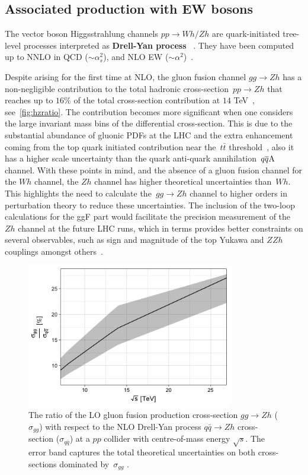 \subsection{Associated production with EW bosons \label{vhproduction}}
The vector boson Higgsstrahlung channels $pp\to Wh/Zh$ are quark-initiated tree-level processes interpreted as \textbf{Drell-Yan process}~ \cite{Han:1991ia,Brein:2003wg}. They have been computed up to  NNLO in QCD ($\sim \alpha_s^2$), and  NLO EW  ($\sim \alpha^2 $)~\cite{Amoroso:2020lgh}.
\par Despite arising for the first time at NLO, the gluon fusion channel $g g \rightarrow Zh$ has a non-negligible contribution to the total hadronic cross-section~$pp\to Zh$ that reaches up to $16\%$ of the total cross-section contribution at $14$ TeV~\cite{Cepeda:2019klc}, see~\autoref{fig:hzratio}. The contribution becomes more significant when one considers the  large invariant mass bins of the differential cross-section. This is due to the substantial abundance of gluonic PDFs at the LHC and the extra enhancement coming from the top quark initiated contribution near the~$t\bar t$ threshold~\cite{Englert:2013vua}, also it has a higher scale uncertainty than the quark anti-quark annihilation~$q\overline q \rm A$ channel.  With these points in mind, and the absence of a gluon fusion channel for the $Wh$ channel, the $Zh$ channel has higher theoretical uncertainties than~$Wh$. This highlights the need to calculate the~$g g \rightarrow Z h$ channel to higher orders in perturbation theory to reduce these uncertainties. The inclusion of the two-loop calculations for the ggF part would facilitate the precision measurement of the $Zh$ channel at the future LHC runs, which in terms provides better constraints on several observables, such as sign and magnitude of the top Yukawa and $ZZh$ couplings amongst others~\cite{Englert:2016hvy}.
\begin{figure}
	\begin{center}
		\includegraphics[width=9cm]{./figures/Rplot}
		\caption{The ratio of the LO gluon fusion production cross-section $ gg \to Zh$  ($\sigma_{gg}$) with respect to the NLO Drell-Yan process $ q\bar{q} \to Zh$ cross-section ($\sigma_{q\bar{q}}$) at a $pp$ collider with centre-of-mass energy $\sqrt{s}$. The error band captures the total theoretical uncertainties on both cross-sections dominated by~$\sigma_{gg}$ .}
		\label{fig:hzratio}
	\end{center}
\end{figure}
